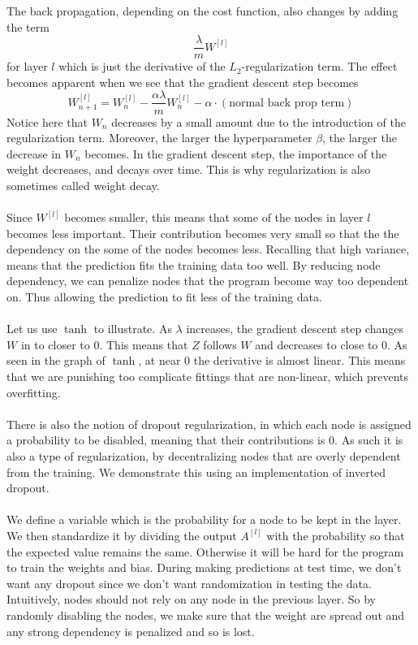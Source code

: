 \documentclass[a4paper]{article}
\begin{document}
\begin{enumerate}
The back propagation, depending on the cost function, also changes by adding the term $$\frac{\lambda}{m}W^{[l]}$$ for layer $l$ which is just the derivative of the $L_2$-regularization term. The effect becomes apparent when we see that the gradient descent step becomes $$W_{n+1}^{[l]}=W_n^{[l]}-\frac{\alpha\lambda}{m}W_n^{[l]}-\alpha\cdot(\text{normal back prop term})$$ Notice here that $W_n$ decreases by a small amount due to the introduction of the regularization term. Moreover, the larger the hyperparameter $\beta$, the larger the decrease in $W_n$ becomes. In the gradient descent step, the importance of the weight decreases, and decays over time. This is why regularization is also sometimes called weight decay. \\~\\
Since $W^{[l]}$ becomes smaller, this means that some of the nodes in layer $l$ becomes less important. Their contribution becomes very small so that the the dependency on the some of the nodes becomes less. Recalling that high variance, means that the prediction fits the training data too well. By reducing node dependency, we can penalize nodes that the program become way too dependent on. Thus allowing the prediction to fit less of the training data. \\~\\
Let us use $\tanh$ to illustrate. As $\lambda$ increases, the gradient descent step changes $W$ in to closer to $0$. This means that $Z$ follows $W$ and decreases to close to $0$. As seen in the graph of $\tanh$, at near $0$ the derivative is almost linear. This means that we are punishing too complicate fittings that are non-linear, which prevents overfitting. \\~\\
There is also the notion of dropout regularization, in which each node is assigned a probability to be disabled, meaning that their contributions is $0$. As such it is also a type of regularization, by decentralizing nodes that are overly dependent from the training. We demonstrate this using an implementation of inverted dropout. \\~\\
We define a variable which is the probability for a node to be kept in the layer. We then standardize it by dividing the output $A^{[l]}$ with the probability so that the expected value remains the same. Otherwise it will be hard for the program to train the weights and bias. During making predictions at test time, we don't want any dropout since we don't want randomization in testing the data. Intuitively, nodes should not rely on any node in the previous layer. So by randomly disabling the nodes, we make sure that the weight are spread out and any strong dependency is penalized and so is lost. \\~\\

\end{enumerate}
\end{document}
